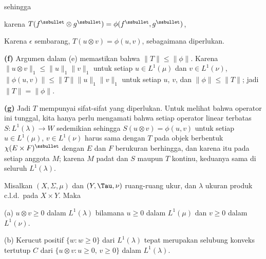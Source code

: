{\noindent sehingga


\noindent karena $T(f^{\ssbullet}\otimes g^{\ssbullet})
=\phi(f^{\ssbullet},g^{\ssbullet})$,


\noindent Karena $\epsilon$ sembarang, $T(u\otimes v)=\phi(u,v)$, sebagaimana
diperlukan.\ \Qed

\medskip

{\bf (f)} Argumen dalam (e) memastikan bahwa $\|T\|\le\|\phi\|$.
Karena $\|u\otimes v\|_1\le\|u\|_1\|v\|_1$ untuk setiap $u\in L^1(\mu)$ dan
$v\in L^1(\nu)$, $\|\phi(u,v)\|\le\|T\|\|u\|_1\|v\|_1$ untuk setiap $u$, $v$,
dan $\|\phi\|\le\|T\|$; jadi $\|T\|=\|\phi\|$.

\medskip

{\bf (g)} Jadi $T$ mempunyai sifat-sifat yang diperlukan. Untuk melihat bahwa operator ini
tunggal, kita hanya perlu mengamati bahwa setiap operator linear terbatas
$S:L^1(\lambda)\to W$ sedemikian sehingga $S(u\otimes v)=\phi(u,v)$ untuk setiap $u\in
L^1(\mu)$, $v\in L^1(\nu)$ harus sama dengan $T$ pada objek berbentuk
$\chi(E\times F)^{\ssbullet}$ dengan $E$ dan $F$ berukuran berhingga,
dan
karena itu pada setiap anggota $M$; karena $M$ padat dan $S$ maupun
$T$ kontinu, keduanya sama di seluruh $L^1(\lambda)$.
}


 Misalkan $(X,\Sigma,\mu)$ dan $(Y,\Tau,\nu)$
ruang-ruang ukur, dan $\lambda$ ukuran produk c.l.d.\ pada $X\times
Y$. Maka

(a) $u\otimes v\ge 0$ dalam
$L^1(\lambda)$ bilamana $u\ge 0$ dalam $L^1(\mu)$ dan $v\ge 0$ dalam
$L^1(\nu)$.

(b) Kerucut positif $\{w:w\ge 0\}$ dari
$L^1(\lambda)$ tepat merupakan selubung
konveks tertutup $C$ dari $\{u\otimes v:u\ge 0,\,v\ge 0\}$ dalam $L^1(\lambda)$.

